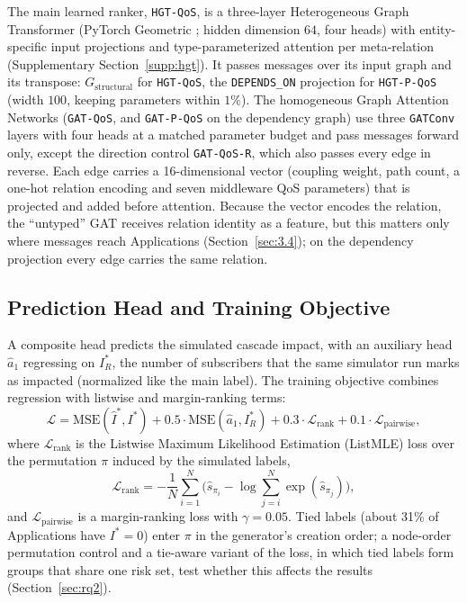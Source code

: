 \documentclass[preprint,3p]{elsarticle}
\begin{document}
The main learned ranker, \texttt{HGT-QoS}, is a three-layer Heterogeneous Graph Transformer \cite{hu2020hgt} (PyTorch Geometric \cite{fey2019fast}; hidden dimension $64$, four heads) with entity-specific input projections and type-parameterized attention per meta-relation (Supplementary Section~\ref{supp:hgt}). It passes messages over its input graph and its transpose: $G_{\text{structural}}$ for \texttt{HGT-QoS}, the \texttt{DEPENDS\_ON} projection for \texttt{HGT-P-QoS} (width $100$, keeping parameters within $1\%$). The homogeneous Graph Attention Networks (\texttt{GAT-QoS}, and \texttt{GAT-P-QoS} on the dependency graph) use three \texttt{GATConv} layers with four heads at a matched parameter budget and pass messages forward only, except the direction control \texttt{GAT-QoS-R}, which also passes every edge in reverse. Each edge carries a 16-dimensional vector (coupling weight, path count, a one-hot relation encoding and seven middleware QoS parameters) that is projected and added before attention. Because the vector encodes the relation, the ``untyped'' GAT receives relation identity as a feature, but this matters only where messages reach Applications (Section~\ref{sec:3.4}); on the dependency projection every edge carries the same relation.

\subsection{Prediction Head and Training Objective}
\label{sec:4.2}

A composite head predicts the simulated cascade impact, with an auxiliary head $\hat{a}_1$ regressing on $I^*_R$, the number of subscribers that the same simulator run marks as impacted (normalized like the main label). The training objective combines regression with listwise and margin-ranking terms:
\begin{equation}
\label{eq:loss_active}
\mathcal{L} = \text{MSE}(\hat{I}^*, I^*) + 0.5 \cdot \text{MSE}(\hat{a}_1, I^*_R) + 0.3 \cdot \mathcal{L}_{\text{rank}} + 0.1 \cdot \mathcal{L}_{\text{pairwise}},
\end{equation}
where $\mathcal{L}_{\text{rank}}$ is the Listwise Maximum Likelihood Estimation (ListMLE) loss \cite{xia2008listwise} over the permutation $\pi$ induced by the simulated labels,
\begin{equation}
\label{eq:listmle}
\mathcal{L}_{\text{rank}} = -\frac{1}{N}\sum_{i=1}^N \Big( \hat{s}_{\pi_i} - \log \sum_{j=i}^N \exp(\hat{s}_{\pi_j}) \Big),
\end{equation}
and $\mathcal{L}_{\text{pairwise}}$ is a margin-ranking loss with $\gamma = 0.05$. Tied labels (about 31\% of Applications have $I^* = 0$) enter $\pi$ in the generator's creation order; a node-order permutation control and a tie-aware variant of the loss, in which tied labels form groups that share one risk set, test whether this affects the results (Section~\ref{sec:rq2}).
\end{document}
